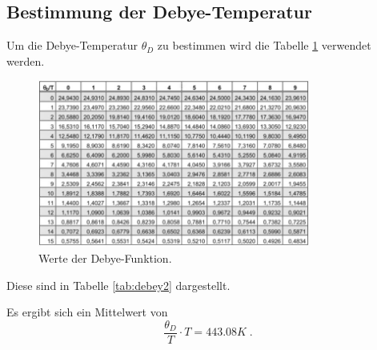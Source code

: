 \subsection{Bestimmung der Debye-Temperatur}
Um die Debye-Temperatur $\theta_D$ zu bestimmen wird die Tabelle \ref{tab:debey} verwendet werden.
\begin{figure}[h] 
    \centering
       \includegraphics[width=0.8\textwidth]{Tabellen/debey.JPG}
    \caption{Werte der Debye-Funktion.\cite{sample}}
    \label{tab:debey}
\end{figure}
Diese sind in Tabelle \ref{tab:debey2} dargestellt.

Es ergibt sich ein Mittelwert von
\begin{equation*}
    \frac{\theta_D}{T}\cdot T =  443.08 K \; .
\end{equation*}

